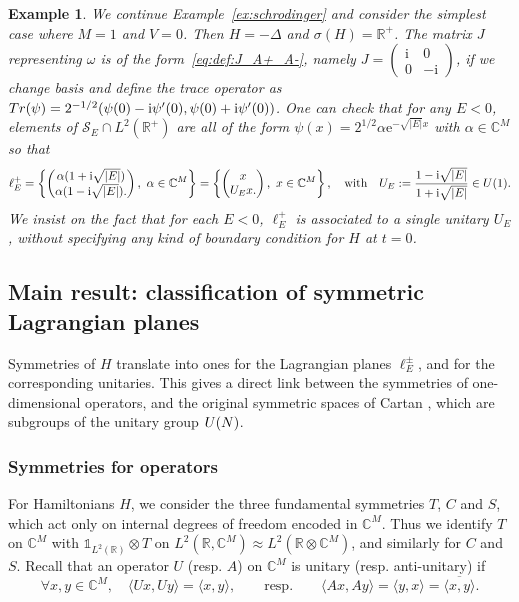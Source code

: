 \documentclass[11pt]{amsart}
\numberwithin{equation}{section} %
\newtheorem{example}[theorem]{Example}
\newcommand\1{{\mathds 1}}
\def\C{{\mathbb C}}
\def\CC{{\mathbb C}}
\def\R{{\mathbb R}}
\def\re{{\mathrm{e}}}
\def\ri{{\mathrm{i}}}
\def\cS{{\mathcal S}}
\def\U{{\rm U}}
\def\bra{\langle}
\def\ket{\rangle}
\def\Tr{{\rm Tr}}
\begin{document}
\begin{example} \label{ex:schrodinger_continuated}
	We continue Example~\ref{ex:schrodinger} and consider the simplest case where $M = 1$ and $V=0$. Then $H = - \Delta$ and $\sigma(H) = \mathbb R^+$. The matrix $J$ representing $\omega$ is of the form~\eqref{eq:def:J_A+_A-}, namely $J = \begin{pmatrix}
        \ri & 0 \\ 0 & - \ri
    \end{pmatrix}$, if we change basis and define the trace operator as $\Tr(\psi) = 2^{-1/2} (\psi(0) - \ri \psi'(0), \psi(0) + \ri \psi'(0))$. One can check that for any $E<0$, elements of $\cS_E \cap L^2(\R^+)$ are all of the form $\psi(x)= 2^{1/2} \alpha \re^{- \sqrt{| E |} x}$ with $\alpha \in \CC^M$ so that 
		$$
		\ell_E^+ = \left\lbrace \begin{pmatrix}
			\alpha ( 1 + \ri \sqrt{| E |}) \\   \alpha ( 1 - \ri \sqrt{| E |}).
		\end{pmatrix}, \ \alpha \in \CC^M \right\rbrace
        = \left\lbrace \begin{pmatrix}
            x \\   U_E x.
        \end{pmatrix}, \ x \in \CC^M \right\rbrace, \quad \text{with} \quad U_E := \frac{1 - \ri \sqrt{| E |}}{1 + \ri \sqrt{| E |}} \in \U(1).
		$$
    We insist on the fact that for each $E<0$, $\ell_E^+$ is associated to a \emph{single} unitary $U_E$, without specifying any kind of boundary condition for $H$ at $t=0$. 
\end{example}

\subsection{Main result: classification of symmetric Lagrangian planes}
Symmetries of $H$ translate into ones for the Lagrangian planes $\ell_E^\pm$, and for the corresponding unitaries. This gives a direct link between the symmetries of one-dimensional operators, and the original symmetric spaces of Cartan \cite{Car-26,Car-27}, which are subgroups of the unitary group $\U(N)$.  

\subsubsection{Symmetries for operators}

For Hamiltonians $H$, we consider  the three fundamental symmetries $T$, $C$ and $S$, which act only on internal degrees of freedom encoded in $\mathbb C^M$. Thus we identify $T$ on $\mathbb C^M$ with $\1_{L^2(\R)} \otimes T$ on $L^2(\R, \C^M) \approx L^2(\R \otimes \C^M)$, and similarly for $C$ and $S$. Recall that an operator $U$ (resp. $A$) on $\C^M$ is unitary  (resp. anti-unitary) if 
\[
    \forall x,y \in \C^M, \quad \bra Ux, Uy \ket = \bra x, y \ket, \qquad \text{resp.} \qquad \bra Ax, Ay \ket = \bra y, x \ket = \overline{\bra x, y \ket}.
\]
\end{document}
